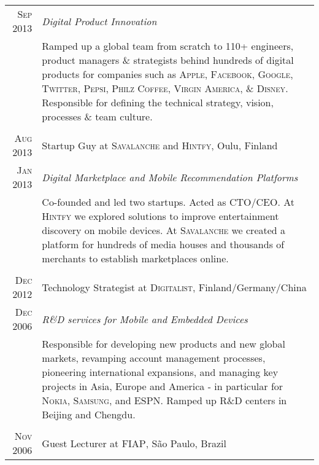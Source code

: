 \documentclass[a4paper,10pt]{article}
\begin{document}
\begin{tabular}{r|p{14cm}}
  \textsc{Sep 2013} & \emph{Digital Product Innovation}\\

  &\footnotesize{Ramped up a global team from scratch to 110+
    engineers, product managers \& strategists behind hundreds of
    digital products for companies such as \textsc{Apple},
    \textsc{Facebook}, \textsc{Google}, \textsc{Twitter},
    \textsc{Pepsi}, \textsc{Philz Coffee}, \textsc{Virgin America},
    \& \textsc{Disney}. Responsible for defining the technical
    strategy, vision, processes \& team culture.}\\

  \multicolumn{2}{c}{}\\

  \textsc{Aug 2013} & Startup Guy at \textsc{Savalanche} and \textsc{Hintfy}, Oulu, Finland \\

  \textsc{Jan 2013} & \emph{Digital Marketplace and Mobile Recommendation Platforms} \\

  &\footnotesize{Co-founded and led two startups. Acted as \textsc{CTO/CEO}. At
    \textsc{Hintfy} we explored solutions to improve entertainment discovery on
    mobile devices. At \textsc{Savalanche} we created a platform for hundreds of
    media houses and thousands of merchants to establish marketplaces online.}\\

  \multicolumn{2}{c}{}\\

  \textsc{Dec 2012} & Technology Strategist at \textsc{Digitalist},
  Finland/Germany/China \\

  \textsc{Dec 2006} & \emph{R\&D services for Mobile and Embedded Devices} \\

  &\footnotesize{Responsible for developing new products and new global markets,
    revamping account management processes, pioneering international expansions,
    and managing key projects in Asia, Europe and America - in particular for
    \textsc{Nokia}, \textsc{Samsung}, and \textsc{ESPN}. Ramped up R\&D centers
    in Beijing and Chengdu.}\\

  \multicolumn{2}{c}{}\\

  \textsc{Nov 2006} & Guest Lecturer at \textsc{FIAP}, S\~{a}o Paulo, Brazil \\


\end{tabular}
\end{document}
